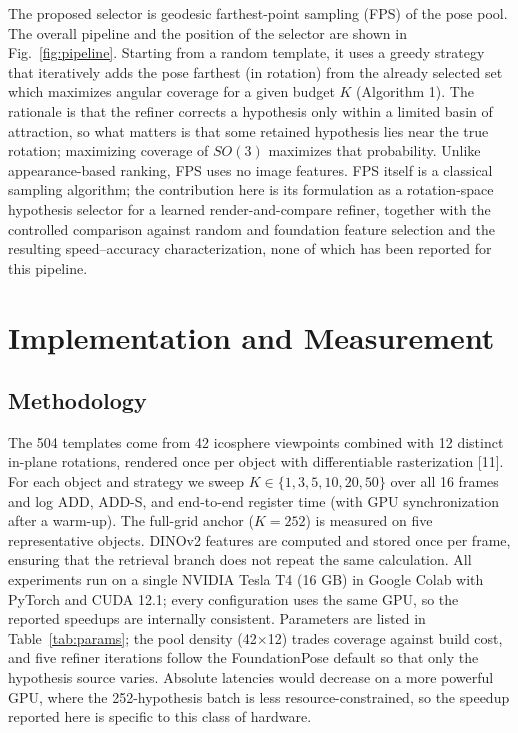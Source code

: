 \documentclass[10pt,twocolumn,letterpaper]{article}
\begin{document}
The proposed selector is geodesic farthest-point sampling (FPS) of the pose pool. The overall pipeline and the position of the selector are shown in Fig.~\ref{fig:pipeline}. Starting from a random template, it uses a greedy strategy that iteratively adds the pose farthest (in rotation) from the already selected set which maximizes angular coverage for a given budget $K$ (Algorithm 1). The rationale is that the refiner corrects a hypothesis only within a limited basin of attraction, so what matters is that some retained hypothesis lies near the true rotation; maximizing coverage of $SO(3)$ maximizes that probability. Unlike appearance-based ranking, FPS uses no image features. FPS itself is a classical sampling algorithm; the contribution here is its formulation as a rotation-space hypothesis selector for a learned render-and-compare refiner, together with the controlled comparison against random and foundation feature selection and the resulting speed--accuracy characterization, none of which has been reported for this pipeline.

\section{Implementation and Measurement}

\subsection{Methodology}
The 504 templates come from 42 icosphere viewpoints combined with 12 distinct in-plane rotations, rendered once per object with differentiable rasterization [11]. For each object and strategy we sweep $K \in \{1, 3, 5, 10, 20, 50\}$ over all 16 frames and log ADD, ADD-S, and end-to-end register time (with GPU synchronization after a warm-up). The full-grid anchor ($K{=}252$) is measured on five representative objects. DINOv2 features are computed and stored once per frame, ensuring that the retrieval branch does not repeat the same calculation. All experiments run on a single NVIDIA Tesla T4 (16 GB) in Google Colab with PyTorch and CUDA 12.1; every configuration uses the same GPU, so the reported speedups are internally consistent. Parameters are listed in Table~\ref{tab:params}; the pool density (42$\times$12) trades coverage against build cost, and five refiner iterations follow the FoundationPose default so that only the hypothesis source varies. Absolute latencies would decrease on a more powerful GPU, where the 252-hypothesis batch is less resource-constrained, so the speedup reported here is specific to this class of hardware.
\end{document}
